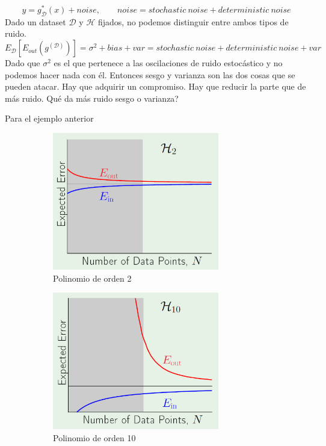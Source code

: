 \documentclass[11pt,a4paper]{article}
\theoremstyle{definition}
\begin{document}
	$$y=g_{\mathcal{D}}^*(x)+noise, \quad \quad noise = stochastic\ noise + deterministic\ noise$$
	Dado un dataset $\mathcal{D}$ y $\mathcal{H}$ fijados, no podemos distinguir entre ambos tipos de ruido.
	$$E_{\mathcal{D}}[E_{out}(g^{(\mathcal{D})})]=\sigma ^2 + bias + var = stochastic\ noise + deterministic\ noise + var$$
	Dado que $\sigma^2$ es el que pertenece a las oscilaciones de ruido estocástico y no podemos hacer nada con él. Entonces sesgo y varianza son las dos cosas que se pueden atacar. Hay que adquirir un compromiso.	Hay que reducir la parte que de más ruido. Qué da más ruido sesgo o varianza?
	
	Para el ejemplo anterior
	
	\begin{figure}[H]
		\centering
		\begin{subfigure}{.5\textwidth}
  		\centering
  		\includegraphics[width=0.8\textwidth]{images/learning_curve1}
  		\caption{Polinomio de orden 2}
  		\label{fig:sub1}
		\end{subfigure}%
		\begin{subfigure}{.5\textwidth}
  		\centering
  		\includegraphics[width=0.8\textwidth]{images/learning_curve2}
  		\caption{Polinomio de orden 10}
  		\label{fig:sub2}
		\end{subfigure}
		\caption{}
		\label{fig:test}
	\end{figure}
\end{document}
